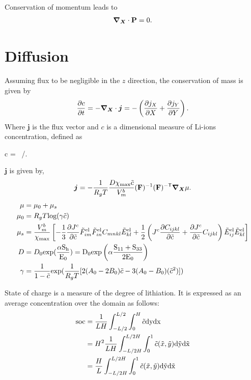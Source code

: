 Conservation of momentum leads to 
\begin{gather}
\bm{\nabla}_{\bm{X}} \cdot \mathbf{P} = 0.
\end{gather}

\section{Diffusion}
Assuming flux to be negligible in the $z$ direction, the conservation of mass is given by
\begin{gather}
    \frac{\partial c}{\partial t} = - \bm{\nabla}_{\bm{X}} \cdot \bm{j} = -\left(\frac{\partial j_X}{\partial X} + \frac{\partial j_Y}{\partial Y}\right).
\end{gather}
Where $\bm{j}$ is the flux vector and $c$ is a dimensional measure of Li-ions concentration, defined as 
\begin{nonumbereq}
    c = \tc \, \xmax/\vmb.
\end{nonumbereq}
$\bm{j}$ is given by, 
\begin{gather}
    \bm{j} = - \frac{1}{R_g T} \frac{D\chi_{{\rm{max}}} \tilde{c}}{V^b_m} (\mathbf{F})^{-1} (\mathbf{F})^{{-\sf {T}}} \bm{\nabla}_{\bm{X}} \mu.
\end{gather}
\begin{align}
    \mu &= \mu_0 + \mu_s \\
    \mu_0 &= R_g T \text{log}(\gamma \tilde{c}) \\
    \mu_s &= \frac{V_m^b}{\chi_{{\rm{max}}}}\left[-\frac{1}{3}\frac{\partial {J^c}}{\partial \tilde{c}}\tilde{F}_{im}^{{\rm{el}}}\tilde{F}_{in}^{{\rm{el}}}{C}_{mnkl}\tilde{E}_{kl}^{{\rm{el}}} + \frac{1}{2}\left({J^c} \frac{\partial C_{ijkl}}{\partial \tilde{c}} + \frac{\partial {J^c}}{\partial \tilde{c}} C_{ijkl}\right)\tilde{E}_{ij}^{{\rm{el}}}\tilde{E}_{kl}^{{\rm{el}}}\right] \\
    D &= D_0 \rm{exp}(\frac{\alpha S_h}{E_0}) = D_0 \rm{exp}\left(\alpha \frac{{S}_{11}+{S}_{33}}{2 E_0}\right) \\ 
    \gamma &= \frac{1}{1-\tilde{c}}\text{exp}(\frac{1}{R_g T}[2(A_0 - 2B_0)\tilde{c} - 3(A_0 - B_0)(\tilde{c}^2)])
\end{align}

State of charge is a measure of the degree of lithiation. It is expressed as an average concentration over the domain as follows:
\begin{align}
    \rm{soc} &= \frac{1}{LH}\int_{-L/2}^{L/2} \int_0^H \tilde{c} \rm{d}y \rm{d}x  \nonumber \\
         &= H^2\frac{1}{LH} \int_{-L/2H}^{L/2H} \int_0^1 \tilde{c}(\tilde{x}, \tilde{y}) \rm{d}\tilde{y} \rm{d}\tilde{x} \nonumber \\
         &= \frac{H}{L}\int_{-L/2H}^{L/2H} \int_0^1 \tilde{c}(\tilde{x}, \tilde{y}) \rm{d}\tilde{y} \rm{d}\tilde{x} 
\end{align}

